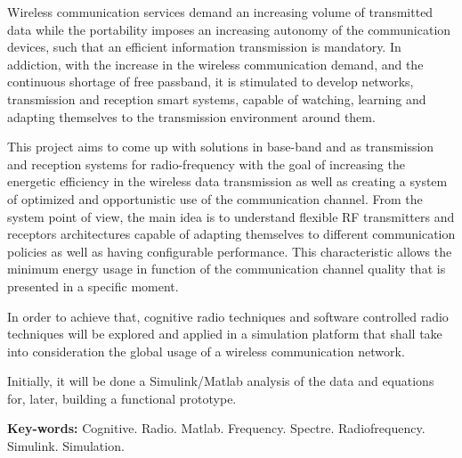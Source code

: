 Wireless communication services demand an increasing volume of transmitted data while the portability imposes an increasing autonomy of the communication devices, such that an efficient information transmission is mandatory. In addiction, with the increase in the wireless communication demand, and the continuous shortage of free passband, it is stimulated to develop networks, transmission and reception smart systems, capable of watching, learning and adapting themselves to the transmission environment around them.

This project aims to come up with solutions in base-band and as transmission and reception systems for radio-frequency with the goal of increasing the energetic efficiency in the wireless data transmission as well as creating a system of optimized and opportunistic use of the communication channel. From the system point of view, the main idea is to understand flexible RF transmitters and receptors architectures capable of adapting themselves to different communication policies as well as having configurable performance. This characteristic allows the minimum energy usage in function of the communication channel quality that is presented in a specific moment.

In order to achieve that, cognitive radio techniques and software controlled radio techniques will be explored and applied in a simulation platform that shall take into consideration the global usage of a wireless communication network.

Initially, it will be done a Simulink/Matlab analysis of the data and equations for, later, building a functional prototype. 

\hfill \break

\noindent \textbf{Key-words:} Cognitive. Radio. Matlab. Frequency. Spectre. Radiofrequency. Simulink. Simulation.